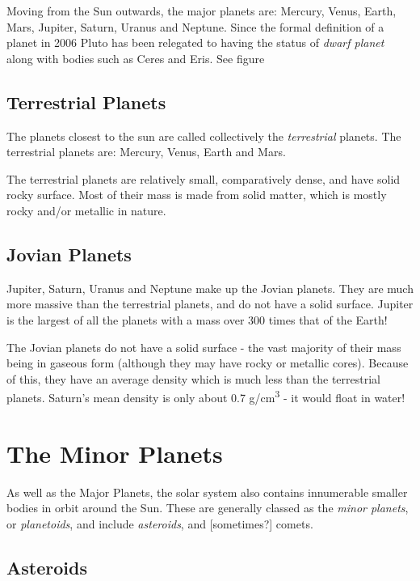 Moving from the Sun outwards, the major planets are: Mercury, Venus,
Earth, Mars, Jupiter, Saturn, Uranus and Neptune. Since the formal
definition of a planet in 2006 Pluto has been relegated to having the
status of \emph{dwarf planet} along with bodies such as Ceres and Eris.
See figure

\subsection{Terrestrial Planets}\label{terrestrial-planets}

The planets closest to the sun are called collectively the
\emph{terrestrial} planets. The terrestrial planets are: Mercury, Venus,
Earth and Mars.

The terrestrial planets are relatively small, comparatively dense, and
have solid rocky surface. Most of their mass is made from solid matter,
which is mostly rocky and/or metallic in nature.

\subsection{Jovian Planets}\label{jovian-planets}

Jupiter, Saturn, Uranus and Neptune make up the Jovian planets. They are
much more massive than the terrestrial planets, and do not have a solid
surface. Jupiter is the largest of all the planets with a mass over 300
times that of the Earth!

The Jovian planets do not have a solid surface - the vast majority of
their mass being in gaseous form (although they may have rocky or
metallic cores). Because of this, they have an average density which is
much less than the terrestrial planets. Saturn's mean density is only
about 0.7 g/cm\textsuperscript{3} - it would float in water!

\section{The Minor Planets}\label{the-minor-planets}

As well as the Major Planets, the solar system also contains innumerable
smaller bodies in orbit around the Sun. These are generally classed as
the \emph{minor planets}, or \emph{planetoids}, and include
\emph{asteroids}, and {[}sometimes?{]} comets.

\subsection{Asteroids}\label{asteroids}

